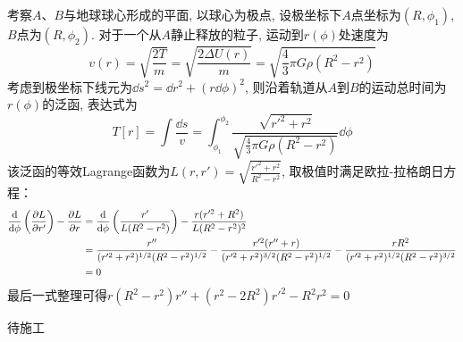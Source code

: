 \begin{solution}
    考察\(A\)、\(B\)与地球球心形成的平面, 以球心为极点, 设极坐标下\(A\)点坐标为\( (R,\phi_1) \), \(B\)点为\( (R,\phi_2) \). 
    对于一个从\(A\)静止释放的粒子, 运动到\( r(\phi) \)处速度为
    \[
        v(r) = \sqrt{\frac{2T}{m}} = \sqrt{\frac{2\Delta U(r)}{m}} = \sqrt{\frac43 \pi G \rho (R^2-r^2)}
    \]
    考虑到极坐标下线元为\( \dd s^2 = \dd r^2 + (r\dd \phi)^2 \), 则沿着轨道从\(A\)到\(B\)的运动总时间为\( r(\phi) \)的泛函, 表达式为
    \[
        T[r] = \int \frac{\dd s}{v}
             = \int_{\phi_1}^{\phi_2} \frac{ \sqrt{r'^2+r^2} }{ \sqrt{\frac43 \pi G \rho (R^2-r^2)} }\dd \phi
    \]
    该泛函的等效Lagrange函数为\( L(r,r')= \sqrt{\frac{r'^2+r^2}{R^2-r^2}} \), 取极值时满足欧拉-拉格朗日方程：
    \[
    \begin{aligned}
        \frac{\dd}{\dd \phi} \left( \frac{\partial L}{\partial r'} \right) - \frac{\partial L}{\partial r}
        & = \frac{\dd}{\dd \phi} \left( \frac{r'}{L(R^2-r^2)} \right) - \frac{r(r'^2+R^2)}{L(R^2-r^2)^2} \\
        & = \frac{r''}{(r'^2+r^2)^{1/2}(R^2-r^2)^{1/2}} - 
            \frac{r'^2(r''+r)}{(r'^2+r^2)^{3/2}(R^2-r^2)^{1/2}} - 
            \frac{rR^2}{(r'^2+r^2)^{1/2}(R^2-r^2)^{3/2}} \\
        & = 0
    \end{aligned}
    \]
    最后一式整理可得\( r(R^2-r^2)r''+(r^2-2R^2)r'^2-R^2r^2 = 0 \)
\end{solution}

\begin{solution}
    待施工
\end{solution}

